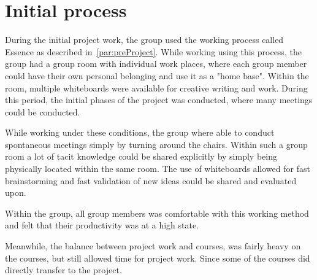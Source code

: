 \section{Initial process}
During the initial project work, the group used the working process called Essence as described in~\autoref{par:preProject}.
While working using this process, the group had a group room with individual work places, where each group member could have their own personal belonging and use it as a "home base".
Within the room, multiple whiteboards were available for creative writing and work.
During this period, the initial phases of the project was conducted, where many meetings could be conducted.

While working under these conditions, the group where able to conduct spontaneous meetings simply by turning around the chairs.
Within such a group room a lot of tacit knowledge could be shared explicitly by simply being physically located within the same room.
The use of whiteboards allowed for fast brainstorming and fast validation of new ideas could be shared and evaluated upon.

Within the group, all group members was comfortable with this working method and felt that their productivity was at a high state. 

Meanwhile, the balance between project work and courses, was fairly heavy on the courses, but still allowed time for project work.
Since some of the courses did directly transfer to the project.
